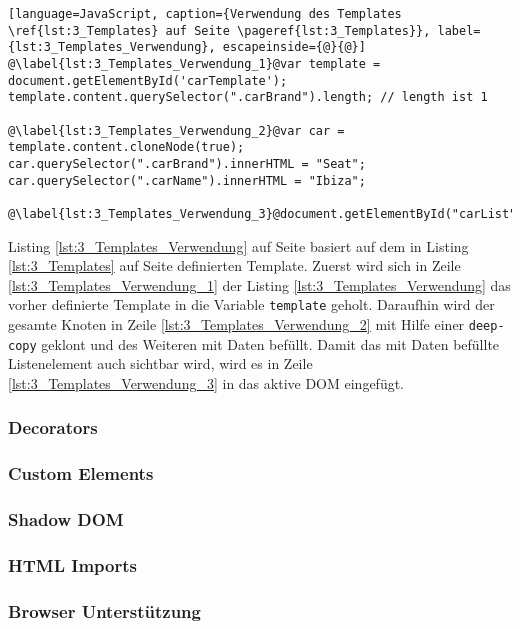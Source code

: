 \begin{lstlisting}[language=JavaScript, caption={Verwendung des Templates \ref{lst:3_Templates} auf Seite \pageref{lst:3_Templates}}, label={lst:3_Templates_Verwendung}, escapeinside={@}{@}]
@\label{lst:3_Templates_Verwendung_1}@var template = document.getElementById('carTemplate');
template.content.querySelector(".carBrand").length; // length ist 1

@\label{lst:3_Templates_Verwendung_2}@var car = template.content.cloneNode(true);
car.querySelector(".carBrand").innerHTML = "Seat";
car.querySelector(".carName").innerHTML = "Ibiza";

@\label{lst:3_Templates_Verwendung_3}@document.getElementById("carList").appendChild(car);
\end{lstlisting}
Listing \ref{lst:3_Templates_Verwendung} auf Seite \pageref{lst:3_Templates_Verwendung} basiert auf dem in Listing \ref{lst:3_Templates} auf Seite \pageref{lst:3_Templates} definierten Template. Zuerst wird sich in Zeile \ref{lst:3_Templates_Verwendung_1} der Listing \ref{lst:3_Templates_Verwendung} das vorher definierte Template in die Variable \lstinline|template| geholt. Daraufhin wird der gesamte Knoten in Zeile \ref{lst:3_Templates_Verwendung_2} mit Hilfe einer \lstinline|deep-copy| geklont und des Weiteren mit Daten befüllt. Damit das mit Daten befüllte Listenelement auch sichtbar wird, wird es in Zeile \ref{lst:3_Templates_Verwendung_3} in das aktive DOM eingefügt.

\subsubsection{Decorators}
\label{sec:3_WC_Decorators}

\subsubsection{Custom Elements}
\label{sec:3_WC_Elements}

\subsubsection{Shadow DOM}
\label{sec:3_WC_Shadow_DOM}

\subsubsection{HTML Imports}
\label{sec:3_WC_Imports}

\subsubsection{Browser Unterstützung}
\label{sec:3_WC_Support}

